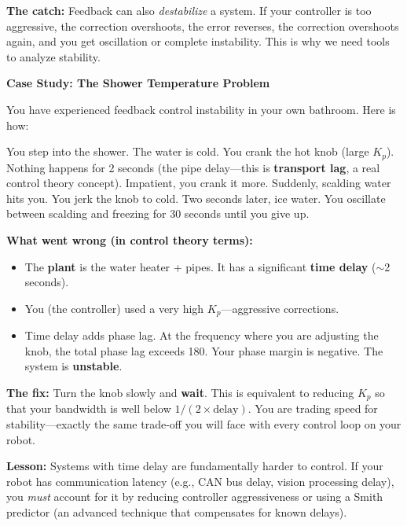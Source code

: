 \textbf{The catch:} Feedback can also \textit{destabilize} a system. If your controller is too aggressive, the correction overshoots, the error reverses, the correction overshoots again, and you get oscillation or complete instability. This is why we need tools to analyze stability.

\vspace{0.5em}
\begin{mdframed}[linewidth=1pt, innertopmargin=10pt, innerbottommargin=10pt]
\textbf{Case Study: The Shower Temperature Problem}

\vspace{0.3em}
You have experienced feedback control instability in your own bathroom. Here is how:

You step into the shower. The water is cold. You crank the hot knob (large $K_p$). Nothing happens for 2 seconds (the pipe delay---this is \textbf{transport lag}, a real control theory concept). Impatient, you crank it more. Suddenly, scalding water hits you. You jerk the knob to cold. Two seconds later, ice water. You oscillate between scalding and freezing for 30 seconds until you give up.

\textbf{What went wrong (in control theory terms):}
\begin{itemize}[nosep]
    \item The \textbf{plant} is the water heater + pipes. It has a significant \textbf{time delay} ($\sim$2 seconds).
    \item You (the controller) used a very high $K_p$---aggressive corrections.
    \item Time delay adds phase lag. At the frequency where you are adjusting the knob, the total phase lag exceeds 180\textdegree{}. Your phase margin is negative. The system is \textbf{unstable}.
\end{itemize}

\textbf{The fix:} Turn the knob slowly and \textbf{wait}. This is equivalent to reducing $K_p$ so that your bandwidth is well below $1/(2 \times \text{delay})$. You are trading speed for stability---exactly the same trade-off you will face with every control loop on your robot.

\textbf{Lesson:} Systems with time delay are fundamentally harder to control. If your robot has communication latency (e.g., CAN bus delay, vision processing delay), you \textit{must} account for it by reducing controller aggressiveness or using a Smith predictor (an advanced technique that compensates for known delays).
\end{mdframed}

